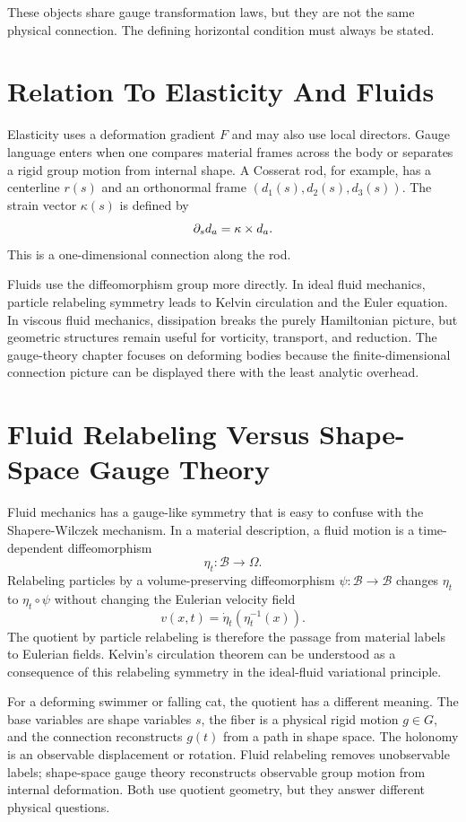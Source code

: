 These objects share gauge transformation laws, but they are not the same
physical connection.  The defining horizontal condition must always be stated.

\section{Relation To Elasticity And Fluids}
\label{sec:gauge-relation-elastic-fluid}

Elasticity uses a deformation gradient \(F\) and may also use local directors.
Gauge language enters when one compares material frames across the body or
separates a rigid group motion from internal shape.  A Cosserat rod, for
example, has a centerline \(r(s)\) and an orthonormal frame
\((d_1(s),d_2(s),d_3(s))\).  The strain vector \(\kappa(s)\) is defined by
\[
        \partial_s d_a=\kappa\times d_a .
\]
This is a one-dimensional connection along the rod.

Fluids use the diffeomorphism group more directly.  In ideal fluid mechanics,
particle relabeling symmetry leads to Kelvin circulation and the Euler
equation.  In viscous fluid mechanics, dissipation breaks the purely
Hamiltonian picture, but geometric structures remain useful for vorticity,
transport, and reduction.  The gauge-theory chapter focuses on deforming
bodies because the finite-dimensional connection picture can be displayed
there with the least analytic overhead.

\section{Fluid Relabeling Versus Shape-Space Gauge Theory}
\label{sec:fluid-relabeling-versus-shape-gauge}

Fluid mechanics has a gauge-like symmetry that is easy to confuse with the
Shapere-Wilczek mechanism.  In a material description, a fluid motion is a
time-dependent diffeomorphism
\[
        \eta_t:\mathcal{B}\to\Omega .
\]
Relabeling particles by a volume-preserving diffeomorphism
\(\psi:\mathcal{B}\to\mathcal{B}\) changes \(\eta_t\) to
\(\eta_t\circ\psi\) without changing the Eulerian velocity field
\[
        v(x,t)=\dot\eta_t(\eta_t^{-1}(x)).
\]
The quotient by particle relabeling is therefore the passage from material
labels to Eulerian fields.  Kelvin's circulation theorem can be understood as
a consequence of this relabeling symmetry in the ideal-fluid variational
principle.

For a deforming swimmer or falling cat, the quotient has a different meaning.
The base variables are shape variables \(s\), the fiber is a physical rigid
motion \(g\in G\), and the connection reconstructs \(g(t)\) from a path in
shape space.  The holonomy is an observable displacement or rotation.  Fluid
relabeling removes unobservable labels; shape-space gauge theory reconstructs
observable group motion from internal deformation.  Both use quotient
geometry, but they answer different physical questions.

